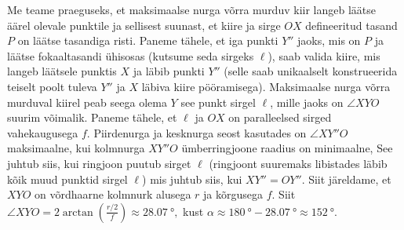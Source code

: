 Me teame praeguseks, et maksimaalse nurga võrra murduv kiir langeb läätse äärel olevale punktile ja sellisest suunast, et kiire ja sirge $OX$ defineeritud tasand $P$ on läätse tasandiga risti. Paneme tähele, et iga punkti $Y''$ jaoks, mis on $P$ ja läätse fokaaltasandi ühisosas (kutsume seda sirgeks $\ell$), saab valida kiire, mis langeb läätsele punktis $X$ ja läbib punkti $Y''$ (selle saab unikaalselt konstrueerida teiselt poolt tuleva $Y''$ ja $X$ läbiva kiire pööramisega). Maksimaalse nurga võrra murduval kiirel peab seega olema $Y$ see punkt sirgel $\ell$, mille jaoks on $\angle XYO$ suurim võimalik. Paneme tähele, et $\ell$ ja $OX$ on paralleelsed sirged vahekaugusega $f$. Piirdenurga ja kesknurga seost kasutades on $\angle XY''O$ maksimaalne, kui kolmnurga $XY''O$ ümberringjoone raadius on minimaalne, See juhtub siis, kui ringjoon puutub sirget $\ell$ (ringjoont suuremaks libistades läbib kõik muud punktid sirgel $\ell$) mis juhtub siis, kui $XY''=OY''$. Siit järeldame, et $XYO$ on võrdhaarne kolmnurk alusega $r$ ja kõrgusega $f$. Siit $\angle XYO=2\arctan\left(\frac{r/2}{f}\right)\approx \SI{28.07}{\degree},$ kust $\alpha\approx \SI{180}{\degree}-\SI{28.07}{\degree} \approx \SI{152}{\degree}$.
\probend